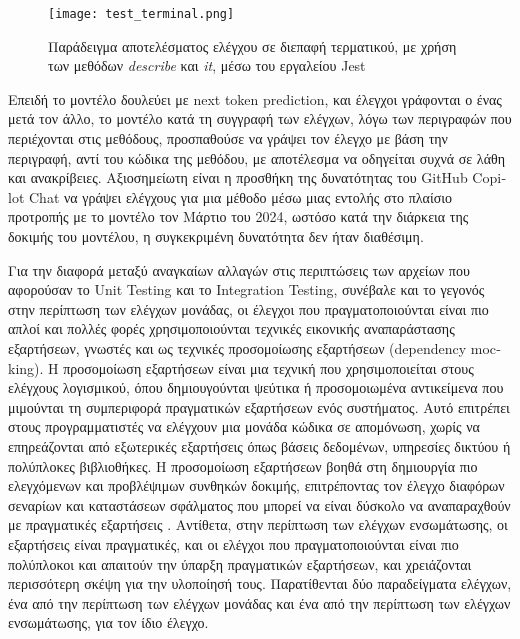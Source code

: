   \begin{figure}[H]
    \begin{center}
      \texttt{[image: test\_terminal.png]}
      \caption{Παράδειγμα αποτελέσματος ελέγχου σε διεπαφή τερματικού, με
        χρήση των μεθόδων \textit{\textlatin{describe}} και
      \textit{\textlatin{it}}, μέσω του εργαλείου \textlatin{Jest}}
    \end{center}
    \label{fig:TestGeneralTerminal}
  \end{figure}

  Επειδή το μοντέλο δουλεύει με \textlatin{next token prediction}, και
  έλεγχοι γράφονται ο ένας μετά τον άλλο, το μοντέλο κατά τη συγγραφή των
  ελέγχων, λόγω των περιγραφών που περιέχονται στις μεθόδους, προσπαθούσε
  να γράψει τον έλεγχο με βάση την περιγραφή, αντί του κώδικα της μεθόδου,
  με αποτέλεσμα να οδηγείται συχνά σε λάθη και ανακρίβειες. Αξιοσημείωτη
  είναι η προσθήκη της δυνατότητας του \textlatin{GitHub Copilot Chat} να
  γράψει ελέγχους για μια μέθοδο μέσω μιας εντολής στο πλαίσιο προτροπής
  με το μοντέλο \cite{copilotchattips} τον Μάρτιο του 2024, ωστόσο κατά
  την διάρκεια της δοκιμής του μοντέλου, η συγκεκριμένη δυνατότητα δεν
  ήταν διαθέσιμη.

  Για την διαφορά μεταξύ αναγκαίων αλλαγών στις περιπτώσεις των αρχείων
  που αφορούσαν το \textlatin{Unit Testing} και το \textlatin{Integration
  Testing}, συνέβαλε και το γεγονός στην περίπτωση των ελέγχων μονάδας,
  οι έλεγχοι που πραγματοποιούνται είναι πιο απλοί και πολλές φορές
  χρησιμοποιούνται τεχνικές εικονικής αναπαράστασης εξαρτήσεων, γνωστές
  και ως τεχνικές προσομοίωσης εξαρτήσεων (\textlatin{dependency
  mocking}). Η προσομοίωση εξαρτήσεων είναι μια τεχνική που
  χρησιμοποιείται στους ελέγχους λογισμικού, όπου δημιουγούνται ψεύτικα ή
  προσομοιωμένα αντικείμενα που μιμούνται τη συμπεριφορά πραγματικών
  εξαρτήσεων ενός συστήματος. Αυτό επιτρέπει στους προγραμματιστές να
  ελέγχουν μια μονάδα κώδικα σε απομόνωση, χωρίς να επηρεάζονται από
  εξωτερικές εξαρτήσεις όπως βάσεις δεδομένων, υπηρεσίες δικτύου ή
  πολύπλοκες βιβλιοθήκες. Η προσομοίωση εξαρτήσεων βοηθά στη δημιουργία
  πιο ελεγχόμενων και προβλέψιμων συνθηκών δοκιμής, επιτρέποντας τον
  έλεγχο διαφόρων σεναρίων και καταστάσεων σφάλματος που μπορεί να είναι
  δύσκολο να αναπαραχθούν με πραγματικές εξαρτήσεις
  \cite{freeman2009growing}. Αντίθετα, στην περίπτωση των ελέγχων
  ενσωμάτωσης, οι εξαρτήσεις είναι πραγματικές, και οι ελέγχοι που
  πραγματοποιούνται είναι πιο πολύπλοκοι και απαιτούν την ύπαρξη
  πραγματικών εξαρτήσεων, και χρειάζονται περισσότερη σκέψη για την
  υλοποίησή τους. Παρατίθενται δύο παραδείγματα ελέγχων, ένα από την
  περίπτωση των ελέγχων μονάδας και ένα από την περίπτωση των ελέγχων
  ενσωμάτωσης, για τον ίδιο έλεγχο.

